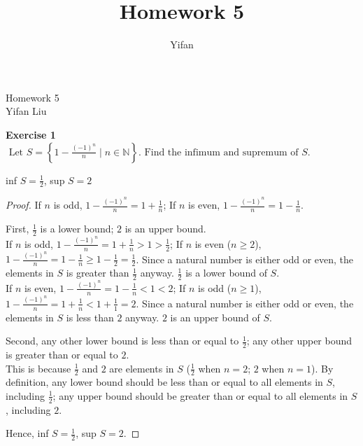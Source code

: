 \documentclass[12pt]{article}
\title{Homework 5}
\author{Yifan}
\theoremstyle{definition}
\numberwithin{equation}{subsection}
\begin{document}
\pagestyle{plain}



\begin{center}
{\large Homework 5} \\
\vspace{.2in}
Yifan Liu
\end{center}

\bigskip \bigskip


\textbf{Exercise 1} $\text { Let } S=\left\{1-\frac{(-1)^{n}}{n}
\mid n \in \mathbb{N}\right\} .
\text { Find the infimum and supremum of } S$.
\begin{center}
    inf $S = \frac{1}{2}$, sup $S = 2$
\end{center}
\begin{proof}
If $n$ is odd, $1-\frac{(-1)^{n}}{n} = 1+\frac{1}{n}$;
If $n$ is even, $1-\frac{(-1)^{n}}{n} = 1-\frac{1}{n}$.

First, $\frac{1}{2}$ is a lower bound; $2$ is an upper bound.\\
If $n$ is odd, $1-\frac{(-1)^{n}}{n} = 1+\frac{1}{n} > 1 > \frac{1}{2}$; If $n$ is even ($n \geq 2$), $1-\frac{(-1)^{n}}{n} = 1-\frac{1}{n} \geq 1-\frac{1}{2} = \frac{1}{2}$. Since a natural number is either odd or even, the elements in $S$ is greater than $\frac{1}{2}$ anyway. $\frac{1}{2}$ is a lower bound of $S$.\\
If $n$ is even, $1-\frac{(-1)^{n}}{n} = 1-\frac{1}{n} < 1 < 2$; If $n$ is odd ($n \geq 1$), $1-\frac{(-1)^{n}}{n} = 1+\frac{1}{n} < 1+\frac{1}{1} = 2$.
Since a natural number is either odd or even, the elements in $S$ is less than $2$ anyway. $2$ is an upper bound of $S$.

Second, any other lower bound is less than or equal to $\frac{1}{2}$; any other upper bound is greater than or equal to $2$.\\
This is because $\frac{1}{2}$ and $2$ are elements in $S$ ($\frac{1}{2}$ when $n =2$; $2$ when $n=1$). By definition, any lower bound should be less than or equal to all elements in $S$, including $\frac{1}{2}$; any upper bound should be greater than or equal to all elements in $S$, including $2$.

Hence, inf $S = \frac{1}{2}$, sup $S = 2$.
\end{proof}
\end{document}
